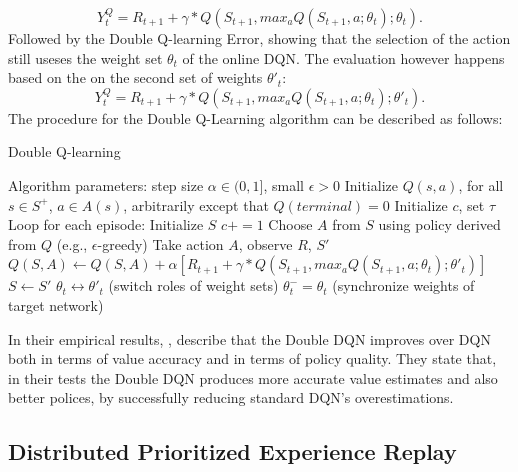 \documentclass[12pt,a4paper]{article}
\begin{document}
\begin{equation}
    \label{eq:q_target_untangled}
    Y_t^Q = R_{t+1} + \gamma * Q(S_{t+1}, max_a Q(S_{t+1}, a;  \theta_t); \theta_t).
\end{equation}
Followed by the Double Q-learning Error, showing that the selection of the action still useses the weight set $\theta_t$ of the online DQN. The evaluation however happens based on the on the second set of weights $\theta'_t$: 
\begin{equation}
    \label{eq:double_q_target}
    Y_t^Q = R_{t+1} + \gamma * Q(S_{t+1}, max_a Q(S_{t+1}, a;  \theta_t); \theta'_t).
\end{equation}
The procedure for the Double Q-Learning algorithm can be described as follows:
\begin{algorithm}
    \caption{Double Q-learning}
    \begin{algorithmic}
    \State Algorithm parameters: step size $\alpha \in (0, 1]$, small  $\epsilon > 0$
    \State Initialize $Q(s,a)$, for all $s\in S^+$, $a\in A(s)$, arbitrarily except that $Q(terminal)=0$
    \State Initialize $c$, set $\tau$
    \State Loop for each episode:
        \State Initialize $S$
        \State $c += 1$
            \State Choose $A$ from $S$ using policy derived from $Q$ (e.g., $\epsilon$-greedy)
            \State Take action $A$, observe $R$, $S'$
            \State $Q(S, A) \leftarrow Q(S, A) + \alpha [R_{t+1}+\gamma * Q(S_{t+1}, max_a Q(S_{t+1}, a;  \theta_t); \theta'_t)]$
            \State $S \leftarrow S'$
            \State $\theta_t \leftrightarrow \theta'_t$ (switch roles of weight sets)
        \EndFor
            \State $\theta_t^- = \theta_t $ (synchronize weights of target network)
        \EndIf
    \EndWhile
    \end{algorithmic}
\end{algorithm}
\newpage
In their empirical results, \cite{VanHasselt2015}, describe that the Double DQN improves over DQN both in terms of value accuracy and in terms of policy quality. They state that, in their tests the Double DQN produces more accurate value estimates and also better polices, by successfully reducing standard DQN's overestimations.


\subsection{Distributed Prioritized Experience Replay}
\end{document}
